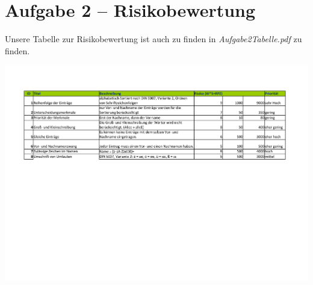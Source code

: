 \section*{Aufgabe 2 -- Risikobewertung}

Unsere Tabelle zur Risikobewertung ist auch zu finden in \emph{Aufgabe2Tabelle.pdf} zu finden.

\hskip-3.0cm\includegraphics[width=1.4\linewidth]{Aufgabe2Tabelle}
